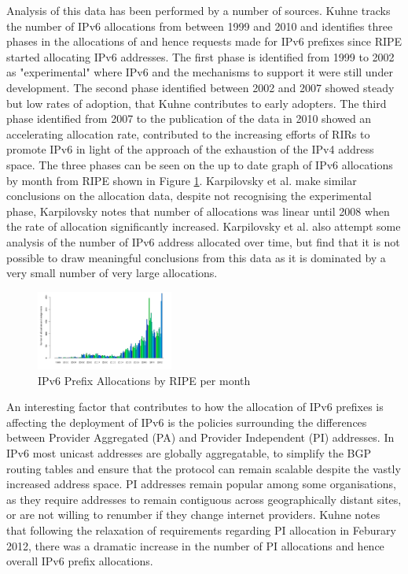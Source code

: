 Analysis of this data has been performed by a number of sources. Kuhne tracks
the number of IPv6 allocations from between 1999 and 2010 and identifies three
phases in the allocations of and hence requests made for IPv6 prefixes since
RIPE started allocating IPv6 addresses\cite{kuhne_interesting_2010}.
The first phase is identified from 1999 to
2002 as "experimental" where IPv6 and the mechanisms to support it were still
under development. The second phase identified between 2002 and 2007 showed
steady but low rates of adoption, that Kuhne contributes to early adopters. The
third phase identified from 2007 to the publication of the data in 2010 showed
an accelerating allocation rate, contributed to the increasing efforts of RIRs
to promote IPv6 in light of the approach of the exhaustion of the IPv4 address
space. The three phases can be seen on the up to date graph of IPv6 allocations
by month from RIPE shown in Figure \ref{fig:alloc-month}. Karpilovsky et al. make
similar conclusions on the allocation data, despite not recognising the
experimental phase, Karpilovsky notes that number of allocations was linear
until 2008 when the rate of allocation significantly increased\cite{karpilovsky_quantifying_2009}.
Karpilovsky et
al. also attempt some analysis of the number of IPv6 address allocated over
time, but find that it is not possible to draw meaningful conclusions from this
data as it is dominated by a very small number of very large allocations.

\begin{figure}[htb]
\centering
\includegraphics[width=0.4\textwidth]{img/v6-alloc-month.png}
\caption{IPv6 Prefix Allocations by RIPE per month}
\label{fig:alloc-month}
\end{figure}

An interesting factor that contributes to how the allocation of IPv6 prefixes is
affecting the deployment of IPv6 is the policies surrounding the differences
between Provider Aggregated (PA) and Provider Independent (PI) addresses. In
IPv6 most unicast addresses are globally aggregatable, to simplify the BGP
routing tables and ensure that the protocol can remain scalable despite the
vastly increased address space. PI addresses remain popular among some
organisations, as they require addresses to remain contiguous across
geographically distant sites, or are not willing to renumber if they change
internet providers. Kuhne notes that following the relaxation of requirements
regarding PI allocation in Feburary 2012, there was a dramatic increase in the 
number of PI allocations and hence overall IPv6 prefix allocations\cite{mirjam_kuhne_update_2012}.

